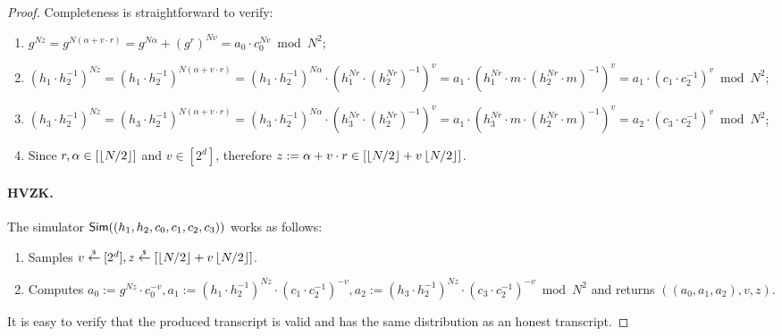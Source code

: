 \begin{proof} 
Completeness is straightforward to verify:
\begin{enumerate}
\item $g^{Nz} = g^{N(\alpha + v \cdot r)} = g^{N\alpha} + (g^r)^{Nv} = a_0 \cdot c_0^{Nv} \bmod N^2$;
\item $(h_1\cdot h_2^{-1})^{Nz} = (h_1\cdot h_2^{-1})^{N(\alpha + v \cdot r)} = (h_1\cdot h_2^{-1})^{N\alpha} \cdot (h_1^{Nr}\cdot (h_2^{Nr})^{-1})^v = a_1 \cdot (h_1^{Nr} \cdot m \cdot (h_2^{Nr} \cdot m)^{-1})^v = a_1 \cdot (c_1\cdot c_2^{-1})^v \bmod N^2$;
\item $(h_3\cdot h_2^{-1})^{Nz} = (h_3\cdot h_2^{-1})^{N(\alpha + v \cdot r)} = (h_3\cdot h_2^{-1})^{N\alpha} \cdot (h_3^{Nr}\cdot (h_2^{Nr})^{-1})^v = a_1 \cdot (h_3^{Nr} \cdot m \cdot (h_2^{Nr} \cdot m)^{-1})^v = a_2 \cdot (c_3\cdot c_2^{-1})^v \bmod N^2$;
\item Since $r, \alpha \in [\left\lfloor N/2 \right\rfloor]$ and $v \in [2^d]$, therefore $z:= \alpha + v \cdot r \in [\left\lfloor N/2 \right\rfloor + v\left\lfloor N/2 \right\rfloor]$. 
\end{enumerate}

\paragraph{HVZK.} The simulator $\mathsf{Sim}((h_1, h_2, c_0, c_1, c_2, c_3))$ works as follows:
\begin{enumerate}
\item Samples $v \stackrel{{\scriptscriptstyle\$}}{\leftarrow} [2^d], z \stackrel{{\scriptscriptstyle\$}}{\leftarrow} [\left\lfloor N/2 \right\rfloor + v\left\lfloor N/2 \right\rfloor]$.
\item Computes $a_0:= g^{Nz} \cdot c_0^{-v}, a_1:= (h_1 \cdot h_2^{-1})^{Nz} \cdot (c_1 \cdot c_2^{-1})^{-v}, a_2:= (h_3 \cdot h_2^{-1})^{Nz} \cdot (c_3 \cdot c_2^{-1})^{-v} \bmod N^2$ and returns $((a_0, a_1, a_2), v, z)$.
\end{enumerate}
It is easy to verify that the produced transcript is valid and has the same distribution as an honest transcript. 



\end{proof}
